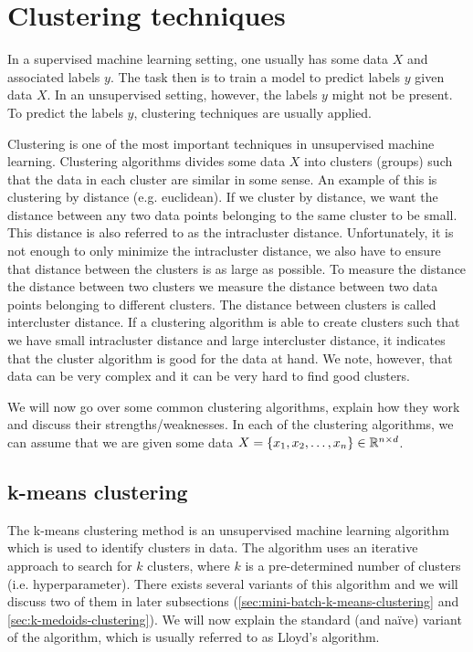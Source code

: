 \section{Clustering techniques}
In a supervised machine learning setting, one usually has some data $X$ and associated labels $y$. The task then is to train a model to predict labels $y$ given data $X$. In an unsupervised setting, however, the labels $y$ might not be present. To predict the labels $y$, clustering techniques are usually applied.

Clustering is one of the most important techniques in unsupervised machine learning. Clustering algorithms divides some data $X$ into clusters (groups) such that the data in each cluster are similar in some sense. An example of this is clustering by distance (e.g. euclidean). If we cluster by distance, we want the distance between any two data points belonging to the same cluster to be small. This distance is also referred to as the intracluster distance. Unfortunately, it is not enough to only minimize the intracluster distance, we also have to ensure that distance between the clusters is as large as possible. To measure the distance the distance between two clusters we measure the distance between two data points belonging to different clusters. The distance between clusters is called intercluster distance. If a clustering algorithm is able to create clusters such that we have small intracluster distance and large intercluster distance, it indicates that the cluster algorithm is good for the data at hand. We note, however, that data can be very complex and it can be very hard to find good clusters.

We will now go over some common clustering algorithms, explain how they work and discuss their strengths/weaknesses. In each of the clustering algorithms, we can assume that we are given some data $X = \left\{x_1, x_2, \ldots, x_n\right\} \in \mathbb{R}^{n \times d}$.

\subsection{k-means clustering}
The k-means clustering method \cite[Section 9.1]{bishop2006} is an unsupervised machine learning algorithm which is used to identify clusters in data. The algorithm uses an iterative approach to search for $k$ clusters, where $k$ is a pre-determined number of clusters (i.e. hyperparameter). There exists several variants of this algorithm and we will discuss two of them in later subsections (\cref{sec:mini-batch-k-means-clustering} and \cref{sec:k-medoids-clustering}). We will now explain the standard (and naïve) variant of the algorithm, which is usually referred to as Lloyd's algorithm.

